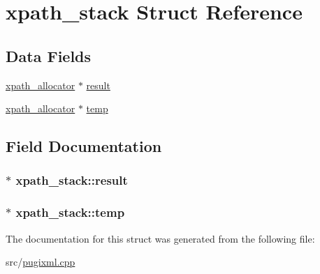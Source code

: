 \hypertarget{structxpath__stack}{
\section{xpath\_\-stack Struct Reference}
\label{structxpath__stack}
}
\subsection*{Data Fields}
\begin{DoxyCompactItemize}
\item 
\hyperlink{classxpath__allocator}{xpath\_\-allocator} $\ast$ \hyperlink{structxpath__stack_adce164b779cbb3d1bc093a772067ea7e}{result}
\item 
\hyperlink{classxpath__allocator}{xpath\_\-allocator} $\ast$ \hyperlink{structxpath__stack_a48edd585dfb910c6c016559f07fea0d8}{temp}
\end{DoxyCompactItemize}


\subsection{Field Documentation}
\hypertarget{structxpath__stack_adce164b779cbb3d1bc093a772067ea7e}{
\subsubsection[{result}]{$\ast$ {\bf xpath\_\-stack::result}}}
\label{structxpath__stack_adce164b779cbb3d1bc093a772067ea7e}
\hypertarget{structxpath__stack_a48edd585dfb910c6c016559f07fea0d8}{
\subsubsection[{temp}]{$\ast$ {\bf xpath\_\-stack::temp}}}
\label{structxpath__stack_a48edd585dfb910c6c016559f07fea0d8}


The documentation for this struct was generated from the following file:\begin{DoxyCompactItemize}
\item 
src/\hyperlink{pugixml_8cpp}{pugixml.cpp}\end{DoxyCompactItemize}
